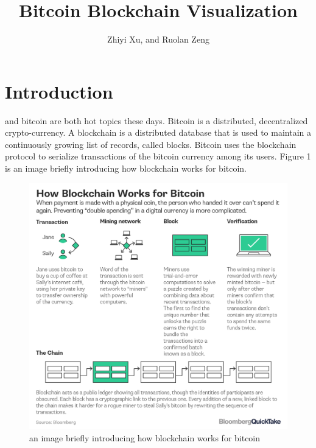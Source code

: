 \documentclass[journal, a4paper]{IEEEtran}
\begin{document}
	\title{Bitcoin Blockchain Visualization}
	\author{Zhiyi Xu, and Ruolan Zeng}
	\maketitle

\begin{abstract}

\end{abstract}
                                                   
\section{Introduction}
	 and bitcoin are both hot topics these days. Bitcoin is a distributed, decentralized crypto-currency. A blockchain is a distributed database that is used to maintain a continuously growing list of records, called blocks. Bitcoin uses the blockchain protocol to serialize transactions of the bitcoin currency among its users. Figure 1 is an image briefly introducing how blockchain works for bitcoin.
\begin{figure}[!hbt]
		\begin{center}
		\includegraphics[width=\columnwidth]{how_blockchain_works.png}
		\caption{an image briefly introducing how blockchain works for bitcoin}
		\label{fig:how_blockchain_works}
		\end{center}
	\end{figure}
\end{document}
